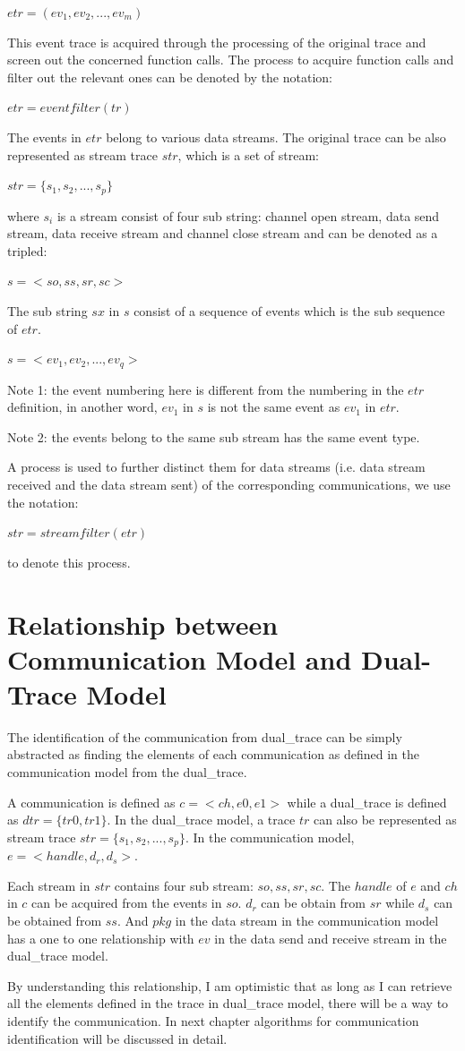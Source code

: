 $etr = (ev_1, ev_2, ..., ev_m)$

This event trace is acquired through the processing of the original trace and screen out the concerned function calls. The process to acquire function calls and filter out the relevant ones can be denoted by the notation: 

$etr = eventfilter(tr)$

The events in $etr$ belong to various data streams. The original trace can be also represented as stream trace $str$, which is a set of stream:

$str = \lbrace s_1, s_2, ..., s_p\rbrace$

where $s_i$ is a stream consist of four sub string: channel open stream, data send stream, data receive stream and channel close stream and can be denoted as a tripled:

$s = <so,ss,sr,sc>$

The sub string $sx$ in $s$ consist of a sequence of events which is the sub sequence of $etr$. 

$s = <ev_1, ev_2,..., ev_q>$

Note 1:  the event numbering here is different from the numbering in the $etr$ definition, in another word, $ev_1$ in $s$ is not the same event as $ev_1$ in $etr$. 

Note 2: the events belong to the same sub stream has the same event type. 

A process is used to further distinct them for data streams (i.e. data stream received and the data stream sent) of the corresponding communications, we use the notation:

$str = streamfilter(etr)$

to denote this process.


\section{Relationship between Communication Model and Dual-Trace Model}
The identification of the communication from dual\_trace can be simply abstracted as finding the elements of each communication as defined in the communication model from the dual\_trace. 

A communication is defined as $c =<ch, e0, e1>$ while a dual\_trace is defined as $dtr = \lbrace tr0, tr1\rbrace$. In the dual\_trace model, a trace $tr$ can also be represented as stream trace $str = \lbrace s_1, s_2, ..., s_p\rbrace$. In the communication model, $ e =<handle, d_r, d_s>$. 

Each stream in $str$ contains four sub stream: $so, ss, sr, sc$.  The $handle$ of $e$ and $ch$ in $c$ can be acquired from the events in $so$. $d_r$ can be obtain from $sr$ while $d_s$ can be obtained from $ss$. And $pkg$ in the data stream in the communication model has a one to one relationship with $ev$ in the data send and receive stream in the dual\_trace model.

By understanding this relationship, I am optimistic that as long as I can retrieve all the elements defined in the trace in dual\_trace model, there will be a way to identify the communication. In next chapter algorithms for communication identification will be discussed in detail. 

